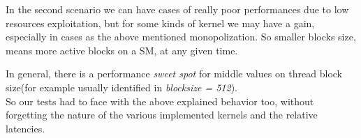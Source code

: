 	In the second scenario we can have cases of really poor performances due to low resources exploitation, but for some kinds of kernel we may have a gain, especially in cases as the above mentioned monopolization. So smaller blocks size, means more active blocks on a SM, at any given time.
	
	In general, there is a performance \textit{sweet spot} for middle values on thread block size(for example usually identified in \textit{blocksize = 512}).\\
	So our tests had to face with the above explained behavior too, without forgetting the nature of the various implemented kernels and the relative latencies.


